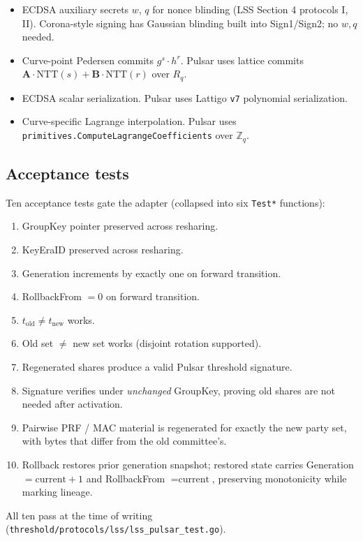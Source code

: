 \begin{itemize}[leftmargin=2em,nosep]
  \item ECDSA auxiliary secrets $w$, $q$ for nonce blinding (LSS
        Section 4 protocols I, II). Corona-style signing has Gaussian
        blinding built into Sign1/Sign2; no $w, q$ needed.
  \item Curve-point Pedersen commits $g^s \cdot h^r$. Pulsar uses
        lattice commits $\mathbf{A}\cdot\mathrm{NTT}(s) + \mathbf{B}
        \cdot\mathrm{NTT}(r)$ over $R_q$.
  \item ECDSA scalar serialization. Pulsar uses Lattigo \texttt{v7}
        polynomial serialization.
  \item Curve-specific Lagrange interpolation. Pulsar uses
        \texttt{primitives.ComputeLagrangeCoefficients} over $\mathbb{Z}_q$.
\end{itemize}

\subsection{Acceptance tests}

Ten acceptance tests gate the adapter (collapsed into six
\texttt{Test*} functions):

\begin{enumerate}[leftmargin=2em,nosep]
  \item GroupKey pointer preserved across resharing.
  \item KeyEraID preserved across resharing.
  \item Generation increments by exactly one on forward transition.
  \item RollbackFrom $= 0$ on forward transition.
  \item $t_{\text{old}} \neq t_{\text{new}}$ works.
  \item Old set $\neq$ new set works (disjoint rotation supported).
  \item Regenerated shares produce a valid Pulsar threshold signature.
  \item Signature verifies under \emph{unchanged} GroupKey, proving
        old shares are not needed after activation.
  \item Pairwise PRF / MAC material is regenerated for exactly the new
        party set, with bytes that differ from the old committee's.
  \item Rollback restores prior generation snapshot; restored state
        carries Generation $= \text{current} + 1$ and RollbackFrom
        $= \text{current}$, preserving monotonicity while marking
        lineage.
\end{enumerate}

All ten pass at the time of writing
(\texttt{threshold/protocols/lss/lss\_pulsar\_test.go}).
